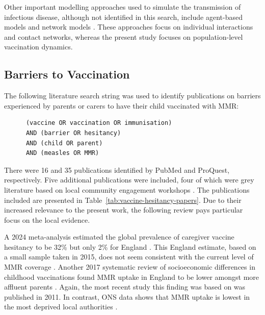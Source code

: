 \documentclass{article}
\begin{document}
Other important modelling approaches used to simulate the transmission of infectious disease, although not identified in this search, include agent-based models  \cite{willem2017lessons} and network models  \cite{keeling2005networks}. These approaches focus on individual interactions and contact networks, whereas the present study focuses on population-level vaccination dynamics.

\subsection{Barriers to Vaccination}
\label{sec:vaccine-barriers}

The following literature search string was used to identify publications on barriers experienced by parents or carers to have their child vaccinated with MMR:

\begin{verbatim}
      (vaccine OR vaccination OR immunisation)
      AND (barrier OR hesitancy)
      AND (child OR parent) 
      AND (measles OR MMR)
\end{verbatim}
There were 16 and 35 publications identified by PubMed and ProQuest, respectively. Five additional publications were included, four of which were grey literature based on local community engagement workshops \cite{smbc_community_engagement_learning_2025, kemishi_uasc_health_wellbeing_2025, palmer_birmingham_measles_engagement_2024, bissett_measles_soft_intelligence_2024}. The publications included are presented in Table~\ref{tab:vaccine-hesitancy-papers}. Due to their increased relevance to the present work, the following review pays particular focus on the local evidence.

A 2024 meta-analysis estimated the global prevalence of caregiver vaccine hesitancy to be 32\% but only 2\% for England \cite{maamor2024prevalence}. This England estimate, based on a small sample taken in 2015, does not seem consistent with the current level of MMR coverage \cite{CAMPBELL20172979}. Another 2017 systematic review of socioeconomic differences in childhood vaccinations found MMR uptake in England to be lower amongst more affluent parents \cite{bocquier2017socioeconomic}. Again, the most recent study this finding was based on was published in 2011. In contrast, ONS data shows that MMR uptake is lowest in the most deprived local authorities \cite{FTips}.
\end{document}
